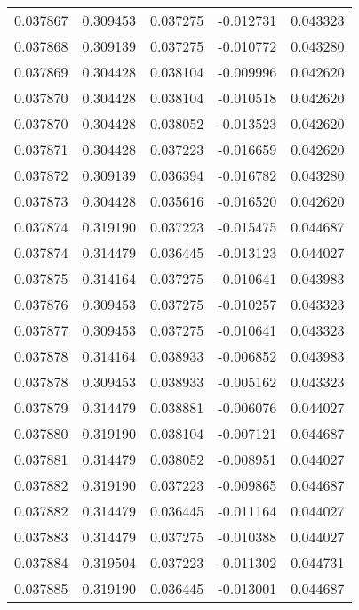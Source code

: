 \begin{tabular}{lrrrr}
0.037867    &  0.309453 &  0.037275 & -0.012731 &             0.043323 \\
0.037868    &  0.309139 &  0.037275 & -0.010772 &             0.043280 \\
0.037869    &  0.304428 &  0.038104 & -0.009996 &             0.042620 \\
0.037870    &  0.304428 &  0.038104 & -0.010518 &             0.042620 \\
0.037870    &  0.304428 &  0.038052 & -0.013523 &             0.042620 \\
0.037871    &  0.304428 &  0.037223 & -0.016659 &             0.042620 \\
0.037872    &  0.309139 &  0.036394 & -0.016782 &             0.043280 \\
0.037873    &  0.304428 &  0.035616 & -0.016520 &             0.042620 \\
0.037874    &  0.319190 &  0.037223 & -0.015475 &             0.044687 \\
0.037874    &  0.314479 &  0.036445 & -0.013123 &             0.044027 \\
0.037875    &  0.314164 &  0.037275 & -0.010641 &             0.043983 \\
0.037876    &  0.309453 &  0.037275 & -0.010257 &             0.043323 \\
0.037877    &  0.309453 &  0.037275 & -0.010641 &             0.043323 \\
0.037878    &  0.314164 &  0.038933 & -0.006852 &             0.043983 \\
0.037878    &  0.309453 &  0.038933 & -0.005162 &             0.043323 \\
0.037879    &  0.314479 &  0.038881 & -0.006076 &             0.044027 \\
0.037880    &  0.319190 &  0.038104 & -0.007121 &             0.044687 \\
0.037881    &  0.314479 &  0.038052 & -0.008951 &             0.044027 \\
0.037882    &  0.319190 &  0.037223 & -0.009865 &             0.044687 \\
0.037882    &  0.314479 &  0.036445 & -0.011164 &             0.044027 \\
0.037883    &  0.314479 &  0.037275 & -0.010388 &             0.044027 \\
0.037884    &  0.319504 &  0.037223 & -0.011302 &             0.044731 \\
0.037885    &  0.319190 &  0.036445 & -0.013001 &             0.044687 \\

\end{tabular}
